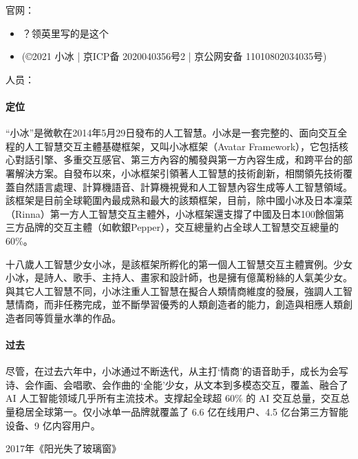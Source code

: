 \documentclass[letterpaper,10pt,english]{sphinxmanual}
\begin{document}
官网：
\begin{itemize}
\item {} 
 ？领英里写的是这个

\item {} 
 (©2021 小冰 | 京ICP备 2020040356号\sphinxhyphen{}2 |
京公网安备 11010802034035号)

\end{itemize}

人员：


\paragraph{定位}
\label{\detokenize{chapter_AI_company/xiaoice:id3}}
“小冰”是微軟在2014年5月29日發布的人工智慧。小冰是一套完整的、面向交互全程的人工智慧交互主體基礎框架，又叫小冰框架（Avatar
Framework），它包括核心對話引擎、多重交互感官、第三方內容的觸發與第一方內容生成，和跨平台的部署解決方案。自發布以來，小冰框架引領著人工智慧的技術創新，相關領先技術覆蓋自然語言處理、計算機語音、計算機視覺和人工智慧內容生成等人工智慧領域。該框架是目前全球範圍內最成熟和最大的該類框架，目前，除中國小冰及日本凜菜（Rinna）第一方人工智慧交互主體外，小冰框架還支撐了中國及日本100餘個第三方品牌的交互主體（如軟銀Pepper），交互總量約占全球人工智慧交互總量的60\%。

十八歲人工智慧少女小冰，是該框架所孵化的第一個人工智慧交互主體實例。少女小冰，是詩人、歌手、主持人、畫家和設計師，也是擁有億萬粉絲的人氣美少女。與其它人工智慧不同，小冰注重人工智慧在擬合人類情商維度的發展，強調人工智慧情商，而非任務完成，並不斷學習優秀的人類創造者的能力，創造與相應人類創造者同等質量水準的作品。


\paragraph{过去}
\label{\detokenize{chapter_AI_company/xiaoice:id4}}
尽管，在过去六年中，小冰通过不断迭代，从主打‘情商’的语音助手，成长为会写诗、会作画、会唱歌、会作曲的‘全能’少女，从文本到多模态交互，覆盖、融合了
AI 人工智能领域几乎所有主流技术。支撑起全球超 60\% 的 AI
交互总量，交互总量稳居全球第一。仅小冰单一品牌就覆盖了 6.6
亿在线用户、4.5 亿台第三方智能设备、9 亿内容用户。

2017年《阳光失了玻璃窗》
\end{document}
